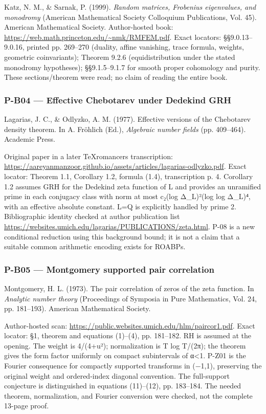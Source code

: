 \documentclass[11pt,a4paper]{article}
\theoremstyle{definition}\newtheorem{definition}{Definition}
\begin{document}
Katz, N. M., \& Sarnak, P. (1999). \emph{Random matrices, Frobenius
eigenvalues, and monodromy} (American Mathematical Society Colloquium
Publications, Vol. 45). American Mathematical Society. Author-hosted
book: \url{https://web.math.princeton.edu/~nmk/RMFEM.pdf}. Exact
locators: §§9.0.13--9.0.16, printed pp. 269--270 (duality, affine
vanishing, trace formula, weights, geometric coinvariants); Theorem
9.2.6 (equidistribution under the stated monodromy hypotheses);
§§9.1.5--9.1.7 for smooth proper cohomology and purity. These
sections/theorem were read; no claim of reading the entire book.

\subsubsection{P-B04 --- Effective Chebotarev under Dedekind
GRH}\label{p-b04--effective-chebotarev-under-dedekind-grh}

Lagarias, J. C., \& Odlyzko, A. M. (1977). Effective versions of the
Chebotarev density theorem. In A. Fröhlich (Ed.), \emph{Algebraic number
fields} (pp. 409--464). Academic Press.

Original paper in a later TeXromancers transcription:
\url{https://aareyanmanzoor.github.io/assets/articles/lagarias-odlyzko.pdf}.
Exact locator: Theorem 1.1, Corollary 1.2, formula (1.4), transcription
p. 4. Corollary 1.2 assumes GRH for the Dedekind zeta function of L and
provides an unramified prime in each conjugacy class with norm at most
c₂(log Δ\_L)²(log log Δ\_L)⁴, with an effective absolute constant. L=Q
is explicitly handled by prime 2. Bibliographic identity checked at
author publication list
\url{https://websites.umich.edu/lagarias/PUBLICATIONS/zeta.html}. P-08
is a new conditional reduction using this background bound; it is not a
claim that a suitable common arithmetic encoding exists for ROABPs.

\subsubsection{P-B05 --- Montgomery supported pair
correlation}\label{p-b05--montgomery-supported-pair-correlation}

Montgomery, H. L. (1973). The pair correlation of zeros of the zeta
function. In \emph{Analytic number theory} (Proceedings of Symposia in
Pure Mathematics, Vol. 24, pp. 181--193). American Mathematical Society.

Author-hosted scan:
\url{https://public.websites.umich.edu/hlm/paircor1.pdf}. Exact locator:
§1, theorem and equations (1)--(4), pp. 181--182. RH is assumed at the
opening. The weight is 4/(4+u²); normalization is T log T/(2π); the
theorem gives the form factor uniformly on compact subintervals of
\textbar α\textbar\textless1. P-Z01 is the Fourier consequence for
compactly supported transforms in (−1,1), preserving the original weight
and ordered-index diagonal convention. The full-support conjecture is
distinguished in equations (11)--(12), pp. 183--184. The needed theorem,
normalization, and Fourier conversion were checked, not the complete
13-page proof.
\end{document}
